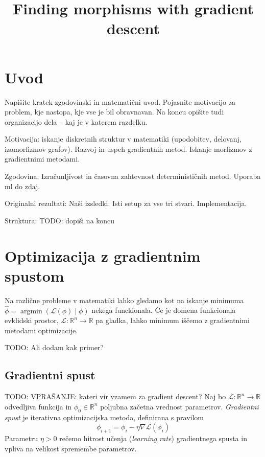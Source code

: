 \documentclass[mat2, tisk]{fmfdelo}
\title{Finding morphisms with gradient
descent}
\newcommand{\TODO}[1]{{\color{blue} TODO: #1}}
\newcommand{\R}{\mathbb R}
\begin{document}
\section{Uvod}
Napišite kratek zgodovinski in matematični uvod.  Pojasnite motivacijo za problem, kje
nastopa, kje vse je bil obravnavan. Na koncu opišite tudi organizacijo dela -- kaj je v
katerem razdelku.

Motivacija: iskanje diskretnih struktur v matematiki (upodobitev, delovanj, izomorfizmov grafov). Razvoj in uspeh gradientnih metod. Iskanje morfizmov z gradientnimi metodami. 

Zgodovina: Izračunljivost in časovna zahtevnost determinističnih metod. Uporaba ml do zdaj. 

Originalni rezultati: Naši izsledki. Isti setup za vse tri stvari. Implementacija. 

Struktura: \TODO{dopiši na koncu}


\section{Optimizacija z gradientnim spustom}
Na različne probleme v matematiki lahko gledamo kot na iskanje minimuma $\hat \phi = \operatorname{argmin}( \mathcal L(\phi) \mid  \phi )$ nekega funckionala. Če je domena funkcionala evklidski prostor, $\mathcal{L}\colon \R^n \to \R$ pa gladka, lahko minimum iščemo z gradientnimi metodami optimizacije.

\begin{primer}
    \TODO{ Ali dodam kak primer?}
\end{primer}

    \subsection{Gradientni spust}
   \begin{definicija}
   \TODO{VPRAŠANJE: kateri vir vzamem za gradient descent?}
       Naj bo $\mathcal{L} \colon \R^n  \to \R$ odvedljiva funkcija in $\phi_0 \in \R^n$ poljubna začetna vrednost parametrov. \emph{Gradientni spust} je iterativna optimizacijska metoda, definirana s pravilom
       \begin{equation}
            \label{eq:gradientni spust}
            \phi_{i+1} = \phi_i - \eta \nabla \mathcal{L}(\phi_i)
       \end{equation}
       Parametru
       $\eta > 0$ rečemo   hitrost učenja (\emph{learning rate}) gradientnega spusta in vpliva na velikost spremembe parametrov.
        \end{definicija} 
\end{document}
